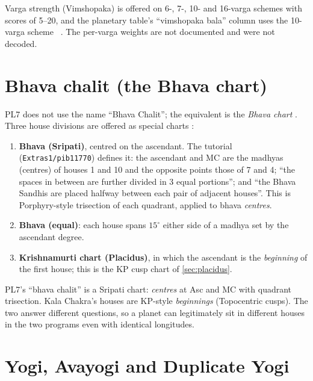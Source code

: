 Varga strength (Vimshopaka) is offered on 6-, 7-, 10- and 16-varga schemes with scores of
5--20, and the planetary table's ``vimshopaka bala'' column uses the 10-varga scheme
\tagDOC\ \parencite[p.~145]{geovision2006pl7}. The per-varga weights are not documented and
were not decoded.

\section{Bhava chalit (the Bhava chart)}
\label{sec:bhava}

PL7 does not use the name ``Bhava Chalit''; the equivalent is the \emph{Bhava chart}
\tagDOC. Three house divisions are offered as special charts
\parencite[p.~56]{geovision2006pl7}:

\begin{enumerate}[leftmargin=*]
  \item \textbf{Bhava (Sripati)}, centred on the ascendant. The tutorial
  (\texttt{Extras1/pib11770}) defines it: the ascendant and MC are the madhyas (centres) of
  houses 1 and 10 and the opposite points those of 7 and 4; ``the spaces in between are
  further divided in 3 equal portions''; and ``the Bhava Sandhis are placed halfway between
  each pair of adjacent houses''. This is Porphyry-style trisection of each quadrant,
  applied to bhava \emph{centres}.
  \item \textbf{Bhava (equal)}: each house spans $15^\circ$ either side of a madhya set by
  the ascendant degree.
  \item \textbf{Krishnamurti chart (Placidus)}, in which the ascendant is the
  \emph{beginning} of the first house; this is the KP cusp chart of \autoref{sec:placidus}.
\end{enumerate}

\begin{keybox}\kidea PL7's ``bhava chalit'' is a Sripati chart: \emph{centres} at Asc and MC
with quadrant trisection. Kala Chakra's houses are KP-style \emph{beginnings}
(Topocentric cusps). The two answer different questions, so a planet can legitimately sit
in different houses in the two programs even with identical longitudes.\end{keybox}

\section{Yogi, Avayogi and Duplicate Yogi}
\label{sec:yogidoc}

